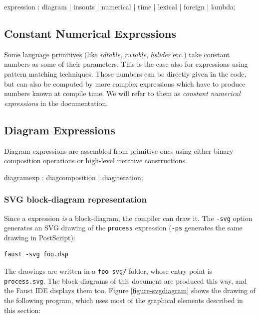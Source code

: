\begin{rail}
expression : diagram | insouts | numerical | time | lexical | foreign | lambda;
\end{rail}

\subsection{Constant Numerical Expressions}

Some language primitives (like \textit{rdtable}, \textit{rwtable}, \textit{hslider} etc.) take constant numbers as some of their parameters. This is the case also for expressions using pattern matching techniques. Those numbers can be directly given in the code, but can also be computed by more complex expressions which have to produce numbers known at compile time. We will refer to them as \textit{constant numerical expressions} in the documentation.

\subsection{Diagram Expressions}

Diagram expressions are assembled from primitive ones using either binary composition operations or high-level iterative constructions.
 
\begin{rail}
diagramexp : diagcomposition | diagiteration;
\end{rail}

\label{svg-diagrams}
\subsubsection{SVG block-diagram representation}

Since a \faust expression \textit{is} a block-diagram, the compiler can draw it. The \lstinline'-svg' option generates an SVG drawing of the \lstinline'process' expression (\lstinline'-ps' generates the same drawing in PostScript):

\begin{lstlisting}
faust -svg foo.dsp
\end{lstlisting}

The drawings are written in a \lstinline'foo-svg/' folder, whose entry point is \lstinline'process.svg'. The block-diagrams of this document are produced this way, and the Faust IDE displays them too. Figure \ref{figure-svgdiagram} shows the drawing of the following program, which uses most of the graphical elements described in this section:


